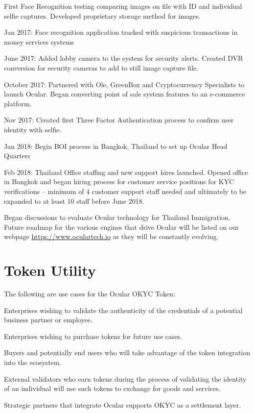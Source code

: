 \documentclass[12pt]{article}
\let\tempone\itemize
\let\temptwo\enditemize
\renewenvironment{itemize}{\tempone\addtolength{\itemsep}{-5pt}}{\temptwo}
\begin{document}
\begin{itemize}
\item First Face Recognition testing comparing images on file with ID and individual selfie captures. Developed proprietary storage method for images.
\item Jan 2017: Face recognition application tracked with suspicious transactions in money services systems
\item June 2017: Added lobby camera to the system for security alerts. Created DVR conversion for security cameras to add to still image capture file.
\item October 2017: Partnered with Ole, GreenBox and Cryptocurrency Specialists to launch Ocular. Began converting point of sale system features to an e-commerce platform.
\item Nov 2017: Created first Three Factor Authentication process to confirm user identity with selfie.
\item Jan 2018: Begin BOI process in Bangkok, Thailand to set up Ocular Head Quarters
\item Feb 2018: Thailand Office staffing and new support hires launched. Opened office in Bangkok and began hiring process for customer service positions for KYC verifications – minimum of 4 customer support staff needed and ultimately to be expanded to at least 10 staff before June 2018.
\item Began discussions to evaluate Ocular technology for Thailand Immigration.
 \end{itemize}
Future roadmap for the various engines that drive Ocular will be listed on our webpage \url{https://www.oculartech.io} as they will be constantly evolving.
\newpage
\section{Token Utility}
The following are use cases for the Ocular OKYC Token: 
\begin{itemize}
  \item Enterprises wishing to validate the authenticity of the credentials of a potential business partner or employee.
  \item Enterprises wishing to purchase tokens for future use cases.
  \item Buyers and potentially end users who will take advantage of the token integration into the ecosystem.
  \item External validators who earn tokens during the process of validating the identity of an individual will use such tokens to exchange for goods and services.
  \item Strategic partners that integrate Ocular supports OKYC as a settlement layer. 
\end{itemize}
\end{document}
